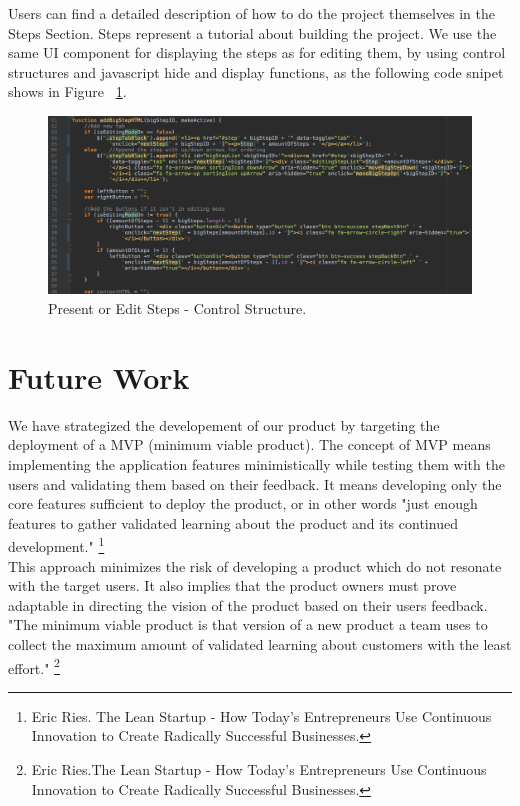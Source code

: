 Users can find a detailed description of how to do the project themselves in the Steps Section. Steps represent a tutorial about building the project. We use the same UI component for displaying the steps as for editing them, by using control structures and javascript hide and display functions, as the following code snipet shows in Figure ~\ref{fig:edit_present_steps}. 

\begin{figure}
\includegraphics[width=1\linewidth]{images/stepsEdit&Present.png}
\caption{Present or Edit Steps - Control Structure.}
\label{fig:edit_present_steps}
\end{figure}	


\chapter{Future Work}

We have strategized the developement of our product by targeting the deployment of a MVP (minimum viable product). The concept of MVP means implementing the application features minimistically while testing them with the users and validating them based on their feedback. It means developing only the core features sufficient to deploy the product, or in other words "just enough features to gather validated learning about the product and its continued development." \cite{leanstartup}\footnote{Eric Ries. The Lean Startup - How Today's Entrepreneurs Use Continuous Innovation to Create Radically Successful Businesses.} \\

This approach minimizes the risk of developing a product which do not resonate with the target users. It also implies that the product owners must prove adaptable in directing the vision of the product based on their users feedback. "The minimum viable product is that version of a new product a team uses to collect the maximum amount of validated learning about customers with the least effort." \footnote{Eric Ries.The Lean Startup - How Today's Entrepreneurs Use Continuous Innovation to Create Radically Successful Businesses.} \\


